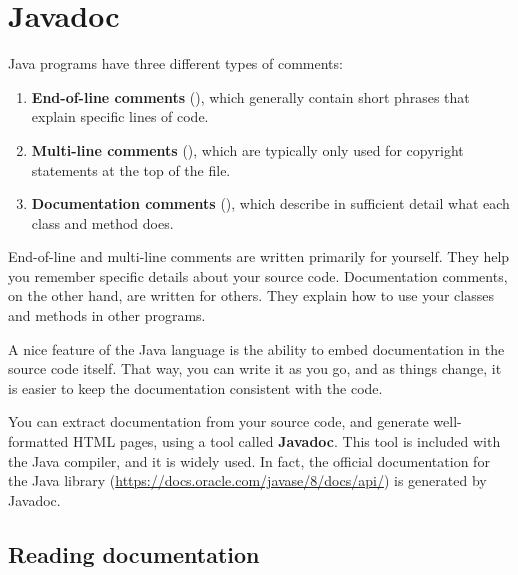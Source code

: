 \chapter{Javadoc}
\label{javadoc}


Java programs have three different types of comments:

\begin{enumerate}
\item {\bf End-of-line comments} (\java{//}), which generally contain short phrases that explain specific lines of code.
\item {\bf Multi-line comments} (\java{/*}), which are typically only used for copyright statements at the top of the file.
\item {\bf Documentation comments} (\java{/**}), which describe in sufficient detail what each class and method does.
\end{enumerate}

End-of-line and multi-line comments are written primarily for yourself.
They help you remember specific details about your source code.
Documentation comments, on the other hand, are written for others.
They explain how to use your classes and methods in other programs.


A nice feature of the Java language is the ability to embed documentation in the source code itself.
That way, you can write it as you go, and as things change, it is easier to keep the documentation consistent with the code.

You can extract documentation from your source code, and generate well-formatted HTML pages, using a tool called {\bf Javadoc}.
This tool is included with the Java compiler, and it is widely used.
In fact, the official documentation for the Java library (\url{https://docs.oracle.com/javase/8/docs/api/}) is generated by Javadoc.


\section{Reading documentation}



